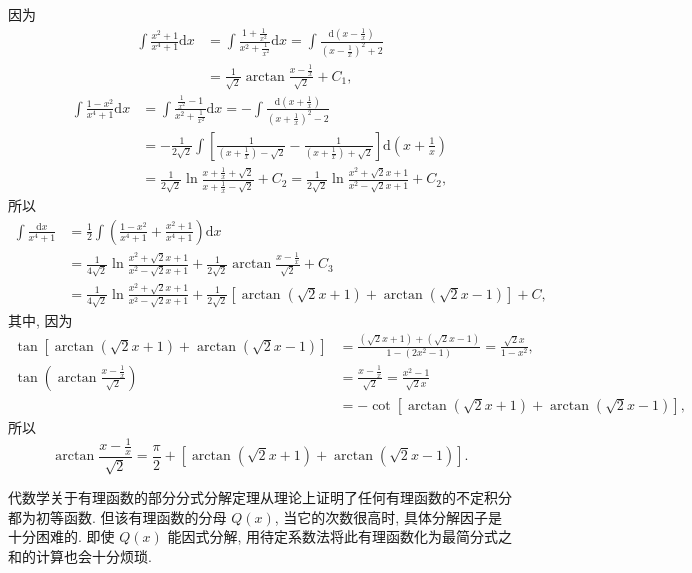 \begin{solution}[解法 2]
因为
\begin{align*}
\int\frac{x^{2}+1}{x^{4}+1}\mathrm{d}x&=\int\frac{1+\frac{1}{x^{2}}}{x^{2}+\frac{1}{x^{2}}}\mathrm{d}x
=\int\frac{\mathrm{d}\left(x-\frac{1}{x}\right)}{\left(x-\frac{1}{x}\right)^{2}+2}\\
&=\frac{1}{\sqrt{2}}\arctan\frac{x-\frac{1}{x}}{\sqrt{2}}+C_{1},
\end{align*}
\begin{align*}
\int\frac{1-x^{2}}{x^{4}+1}\mathrm{d}x&=\int\frac{\frac{1}{x^{2}}-1}{x^{2}+\frac{1}{x^{2}}}\mathrm{d}x
=-\int\frac{\mathrm{d}\left(x+\frac{1}{x}\right)}{\left(x+\frac{1}{x}\right)^{2}-2}\\
&=-\frac{1}{2\sqrt{2}}\int\left[\frac{1}{\left(x+\frac{1}{x}\right)-\sqrt{2}}
-\frac{1}{\left(x+\frac{1}{x}\right)+\sqrt{2}}\right]\mathrm{d}\left(x+\frac{1}{x}\right)\\
&=\frac{1}{2\sqrt{2}}\ln\frac{x+\frac{1}{x}+\sqrt{2}}{x+\frac{1}{x}-\sqrt{2}}+C_{2}
=\frac{1}{2\sqrt{2}}\ln\frac{x^{2}+\sqrt{2}x+1}{x^{2}-\sqrt{2}x+1}+C_{2},
\end{align*}
所以
\begin{align*}
\int\frac{\mathrm{d}x}{x^{4}+1}&=\frac{1}{2}\int\left(\frac{1-x^{2}}{x^{4}+1}+\frac{x^{2}+1}{x^{4}+1}\right)\mathrm{d}x\\
&=\frac{1}{4\sqrt{2}}\ln\frac{x^{2}+\sqrt{2}x+1}{x^{2}-\sqrt{2}x+1}+\frac{1}{2\sqrt{2}}\arctan\frac{x-\frac{1}{x}}{\sqrt{2}}+C_{3}\\
&=\frac{1}{4\sqrt{2}}\ln\frac{x^{2}+\sqrt{2}x+1}{x^{2}-\sqrt{2}x+1}
+\frac{1}{2\sqrt{2}}\left[\arctan(\sqrt{2}x+1)+\arctan(\sqrt{2}x-1)\right]+C,
\end{align*}
其中, 因为
\begin{align*}
\tan\left[\arctan(\sqrt{2}x+1)+\arctan(\sqrt{2}x-1)\right]
&=\frac{(\sqrt{2}x+1)+(\sqrt{2}x-1)}{1-(2x^{2}-1)}=\frac{\sqrt{2}x}{1-x^{2}},\\
\tan\left(\arctan\frac{x-\frac{1}{x}}{\sqrt{2}}\right)&=\frac{x-\frac{1}{x}}{\sqrt{2}}=\frac{x^{2}-1}{\sqrt{2}x}\\
&=-\cot\left[\arctan(\sqrt{2}x+1)+\arctan(\sqrt{2}x-1)\right],
\end{align*}
所以
\[
\arctan\frac{x-\frac{1}{x}}{\sqrt{2}}=\frac{\pi}{2}+\left[\arctan(\sqrt{2}x+1)+\arctan(\sqrt{2}x-1)\right].
\]
\end{solution}

代数学关于有理函数的部分分式分解定理从理论上证明了任何有理函数的不定积分都为初等函数. 但该有理函数的分母 $Q(x)$, 当它的次数很高时, 具体分解因子是十分困难的. 即使 $Q(x)$ 能因式分解, 用待定系数法将此有理函数化为最简分式之和的计算也会十分烦琐.

